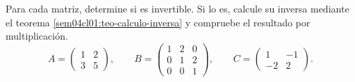 \documentclass[compacto,10pt]{pubciencias-notas}
\begin{document}
\begin{ejer}
    Para cada matriz, determine si es invertible. Si lo es, calcule su inversa
    mediante el teorema \ref{sem04cl01:teo-calculo-inversa} y compruebe el
    resultado por multiplicación.
    \[
        A=\begin{pmatrix}1&2\\3&5\end{pmatrix},
        \qquad
        B=\begin{pmatrix}1&2&0\\0&1&2\\0&0&1\end{pmatrix},
        \qquad
        C=\begin{pmatrix}1&-1\\-2&2\end{pmatrix}.
    \]
\end{ejer}
\end{document}
